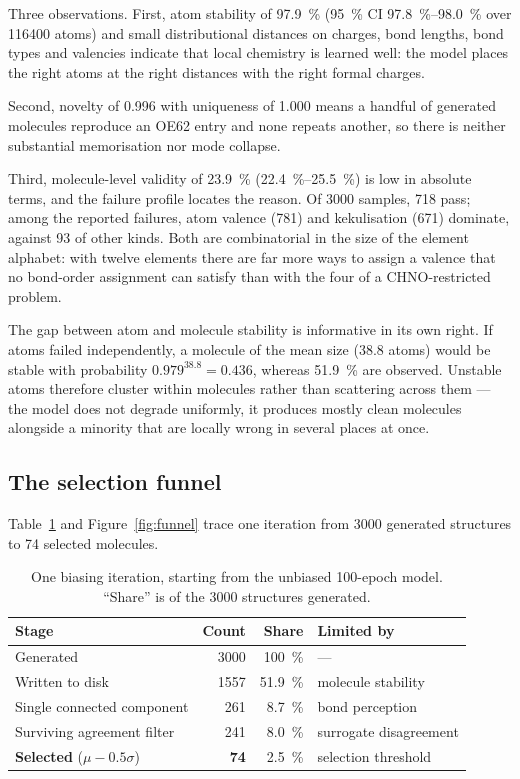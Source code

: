 \documentclass[runningheads]{llncs}
\begin{document}
Three observations. First, atom stability of \SI{97.9}{\percent}
(\SI{95}{\percent} CI \SIrange{97.8}{98.0}{\percent} over \num{116400}
atoms) and small distributional distances on charges, bond lengths, bond
types and valencies indicate that local chemistry is learned well: the
model places the right atoms at the right distances with the right formal
charges.

Second, novelty of \num{0.996} with uniqueness of \num{1.000} means a
handful of generated molecules reproduce an OE62 entry and none repeats
another, so there is neither substantial memorisation nor mode collapse.

Third, molecule-level validity of \SI{23.9}{\percent}
(\SIrange{22.4}{25.5}{\percent}) is low in absolute terms, and the failure
profile locates the reason. Of \num{3000} samples, \num{718} pass; among
the reported failures, atom valence (\num{781}) and kekulisation
(\num{671}) dominate, against \num{93} of other kinds. Both are
combinatorial in the size of the element alphabet: with twelve elements
there are far more ways to assign a valence that no bond-order assignment
can satisfy than with the four of a CHNO-restricted problem.

The gap between atom and molecule stability is informative in its own
right. If atoms failed independently, a molecule of the mean size
(\num{38.8} atoms) would be stable with probability
$0.979^{38.8}=\num{0.436}$, whereas \SI{51.9}{\percent} are observed.
Unstable atoms therefore cluster within molecules rather than scattering
across them --- the model does not degrade uniformly, it produces mostly
clean molecules alongside a minority that are locally wrong in several
places at once.

\subsection{The selection funnel}
\label{sec:funnel}

Table~\ref{tab:funnel-loop} and Figure~\ref{fig:funnel} trace one
iteration from \num{3000} generated structures to \num{74} selected
molecules.

\begin{table}[t]
\centering
\caption{One biasing iteration, starting from the unbiased 100-epoch
model. ``Share'' is of the \num{3000} structures generated.}
\label{tab:funnel-loop}
\begin{tabular}{lrrl}
\toprule
Stage & Count & Share & Limited by \\
\midrule
Generated                & \num{3000} & \SI{100}{\percent} & --- \\
Written to disk          & \num{1557} & \SI{51.9}{\percent} & molecule stability \\
Single connected component& \num{261} & \SI{8.7}{\percent}  & bond perception \\
Surviving agreement filter& \num{241} & \SI{8.0}{\percent}  & surrogate disagreement \\
\textbf{Selected} ($\mu-0.5\sigma$) & \textbf{\num{74}} & \SI{2.5}{\percent} & selection threshold \\
\bottomrule
\end{tabular}
\end{table}
\end{document}
